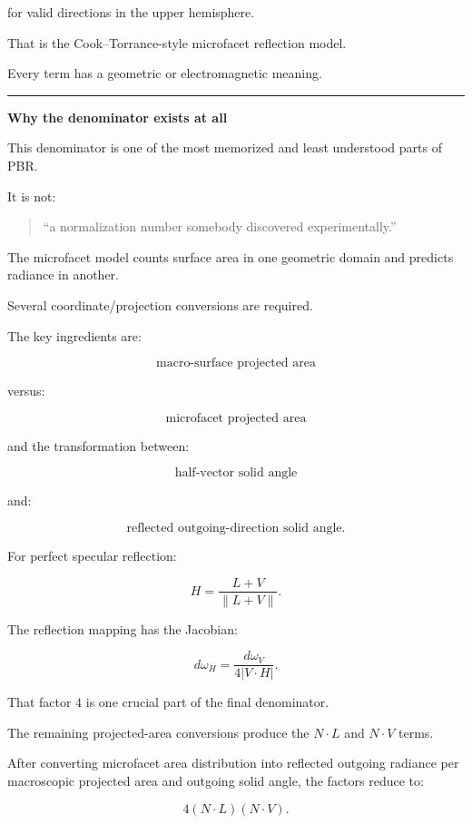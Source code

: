 for valid directions in the upper hemisphere.

That is the Cook--Torrance-style microfacet reflection model.

Every term has a geometric or electromagnetic meaning.

\begin{center}\rule{0.5\linewidth}{0.5pt}\end{center}

\textbf{Why the denominator exists at all}

This denominator is one of the most memorized and least understood parts of PBR.

It is not:

\begin{quote}
``a normalization number somebody discovered experimentally.''
\end{quote}

The microfacet model counts surface area in one geometric domain and predicts radiance in another.

Several coordinate/projection conversions are required.

The key ingredients are:

\[
\boxed{
\text{macro-surface projected area}
}
\]

versus:

\[
\boxed{
\text{microfacet projected area}
}
\]

and the transformation between:

\[
\boxed{
\text{half-vector solid angle}
}
\]

and:

\[
\boxed{
\text{reflected outgoing-direction solid angle}.
}
\]

For perfect specular reflection:

\[
H=
\frac{L+V}{\|L+V\|}.
\]

The reflection mapping has the Jacobian:

\[
\boxed{
d\omega_H
=
\frac{
d\omega_V
}{
4|V\cdot H|
}.
}
\]

That factor \(4\) is one crucial part of the final denominator.

The remaining projected-area conversions produce the \(N\cdot L\) and \(N\cdot V\) terms.

After converting microfacet area distribution into reflected outgoing radiance per macroscopic projected area and outgoing solid angle, the factors reduce to:

\[
\boxed{
4(N\cdot L)(N\cdot V)
}.
\]

